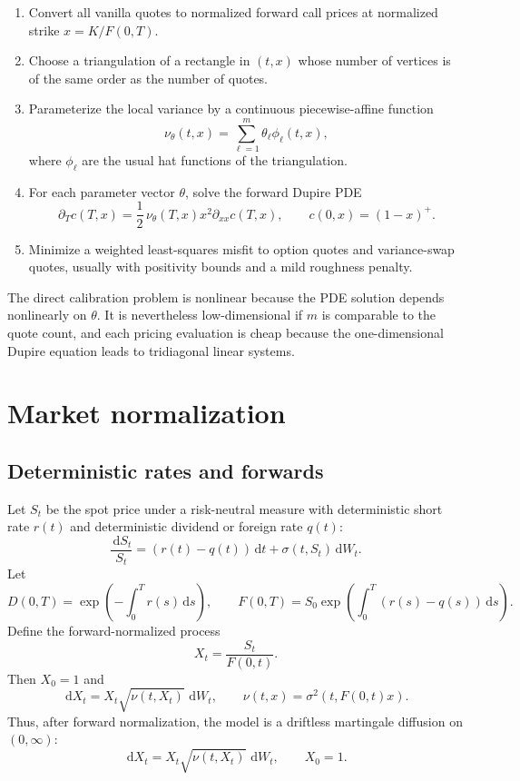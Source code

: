 \documentclass[11pt]{article}
\newcommand{\1}{\mathbf{1}}
\newcommand{\dd}{\,\mathrm{d}}
\newcommand{\vloc}{\nu}
\begin{document}
\begin{enumerate}[label=\textbf{Step \arabic*.},leftmargin=2.2cm]
\item Convert all vanilla quotes to normalized forward call prices at normalized strike
      $x=K/F(0,T)$.
\item Choose a triangulation of a rectangle in $(t,x)$ whose number of vertices is of the
      same order as the number of quotes.
\item Parameterize the local variance by a continuous piecewise-affine function
      \[
        \vloc_\theta(t,x)=\sum_{\ell=1}^{m}\theta_\ell\phi_\ell(t,x),
      \]
      where $\phi_\ell$ are the usual hat functions of the triangulation.
\item For each parameter vector $\theta$, solve the forward Dupire PDE
      \[
        \partial_T c(T,x)=\frac12\,\vloc_\theta(T,x)x^2\partial_{xx}c(T,x),
        \qquad c(0,x)=(1-x)^+.
      \]
\item Minimize a weighted least-squares misfit to option quotes and variance-swap quotes,
      usually with positivity bounds and a mild roughness penalty.
\end{enumerate}

The direct calibration problem is nonlinear because the PDE solution depends nonlinearly
on $\theta$. It is nevertheless low-dimensional if $m$ is comparable to the quote count,
and each pricing evaluation is cheap because the one-dimensional Dupire equation leads
to tridiagonal linear systems.

\section{Market normalization}

\subsection{Deterministic rates and forwards}

Let $S_t$ be the spot price under a risk-neutral measure with deterministic short rate
$r(t)$ and deterministic dividend or foreign rate $q(t)$:
\[
  \frac{\dd S_t}{S_t}=(r(t)-q(t))\dd t+\sigma(t,S_t)\dd W_t.
\]
Let
\[
  D(0,T)=\exp\left(-\int_0^T r(s)\dd s\right),
  \qquad
  F(0,T)=S_0\exp\left(\int_0^T (r(s)-q(s))\dd s\right).
\]
Define the forward-normalized process
\[
  X_t=\frac{S_t}{F(0,t)}.
\]
Then $X_0=1$ and
\[
  \dd X_t=X_t\sqrt{\vloc(t,X_t)}\,\dd W_t,
  \qquad
  \vloc(t,x)=\sigma^2(t,F(0,t)x).
\]
Thus, after forward normalization, the model is a driftless martingale diffusion on
$(0,\infty)$:
\begin{equation}
  \boxed{\dd X_t=X_t\sqrt{\vloc(t,X_t)}\,\dd W_t,\qquad X_0=1.}
  \label{eq:forward_sde}
\end{equation}
\end{document}
